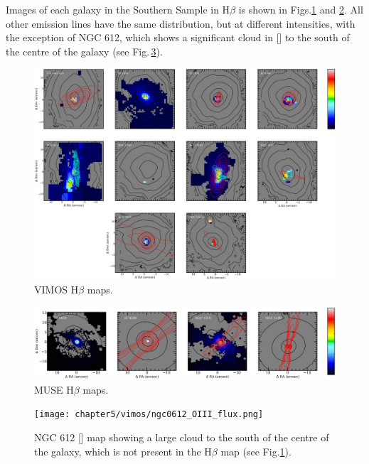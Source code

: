		Images of each galaxy in the Southern Sample in H$\beta$ is shown in Figs.\ref{fig:VIMOS_Hb} and \ref{fig:MUSE_Hb}. All other emission lines have the same distribution, but at different intensities, with the exception of NGC 612, which shows a significant cloud in [] to the south of the centre of the galaxy (see Fig.\,\ref{fig:NGC612_OIII}). 


		\begin{figure}
			\centering
			\includegraphics[width=\textwidth]{chapter5/vimos/Hb.png}
			\caption[VIMOS H$\beta$ maps]{VIMOS H$\beta$ maps.} 
			\label{fig:VIMOS_Hb}
		\end{figure}
		\begin{figure}
			\centering
			\includegraphics[width=\textwidth]{chapter5/muse/Hb.png}
			\caption[MUSE H$\beta$ maps]{MUSE H$\beta$ maps.} 
			\label{fig:MUSE_Hb}
		\end{figure}


		\begin{figure}
			\centering
			\texttt{[image: chapter5/vimos/ngc0612\_OIII\_flux.png]}
			\caption[NGC 612  image]{NGC 612 [] map showing a large cloud to the south of the centre of the galaxy, which is not present in the H$\beta$ map (see Fig.\ref{fig:VIMOS_Hb}).} 
			\label{fig:NGC612_OIII}
		\end{figure}



